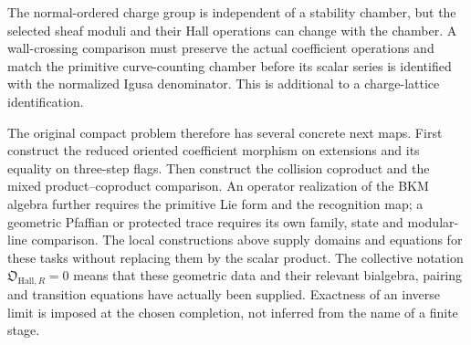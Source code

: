 The normal-ordered charge group is independent of a stability
chamber, but the selected sheaf moduli and their Hall operations
can change with the chamber. A wall-crossing comparison must
preserve the actual coefficient operations and match the
primitive curve-counting chamber before its scalar series is
identified with the normalized Igusa denominator. This is
additional to a charge-lattice identification.

The original compact problem therefore has several concrete
next maps. First construct the reduced oriented coefficient
morphism on extensions and its equality on three-step flags.
Then construct the collision coproduct and the mixed
product--coproduct comparison. An operator realization of the
BKM algebra further requires the primitive Lie form and the
recognition map; a geometric Pfaffian or protected trace
requires its own family, state and modular-line comparison.
The local constructions above supply domains and equations
for these tasks without replacing them by the scalar product.
The collective notation $\mathfrak O_{\mathrm{Hall},R}=0$
means that these geometric data and their relevant bialgebra,
pairing and transition equations have actually been supplied.
Exactness of an inverse limit is imposed at the chosen
completion, not inferred from the name of a finite stage.
